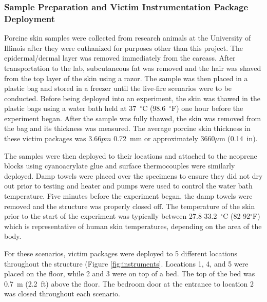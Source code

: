 \documentclass[12pt,oneside]{book}
\begin{document}
\subsubsection{Sample Preparation and Victim Instrumentation Package Deployment}
Porcine skin samples were collected from research animals at the University of Illinois after they were euthanized for purposes other than this project. The epidermal/dermal layer was removed immediately from the carcass.  After transportation to the lab, subcutaneous fat was removed and the hair was shaved from the top layer of the skin using a razor. The sample was then placed in a plastic bag and stored in a freezer until the live-fire scenarios were to be conducted. Before being deployed into an experiment, the skin was thawed in the plastic bags using a water bath held at 37~$^\circ$C (98.6~$^\circ$F) one hour before the experiment began. After the sample was fully thawed, the skin was removed from the bag and its thickness was measured. The average porcine skin thickness in these victim packages was 3.66$pm$ 0.72~mm or approximately 3660$\mu$m (0.14~in).  

The samples were then deployed to their locations and attached to the neoprene blocks using cyanoacrylate glue and surface thermocouples were similarly deployed. Damp towels were placed over the specimens to ensure they did not dry out prior to testing and heater and pumps were used to control the water bath temperature. Five minutes before the experiment began, the damp towels were removed and the structure was properly closed off. The temperature of the skin prior to the start of the experiment was typically between 27.8-33.2~$^\circ$C (82-92$^\circ$F) which is representative of human skin temperatures, depending on the area of the body.

For these scenarios, victim packages were deployed to 5 different locations throughout the structure (Figure \ref{fig:instruments}.  Locations 1, 4, and 5 were placed on the floor, while 2 and 3 were on top of a bed. The top of the bed was 0.7~m (2.2~ft) above the floor.  The bedroom door at the entrance to location 2 was closed throughout each scenario.  
\end{document}
